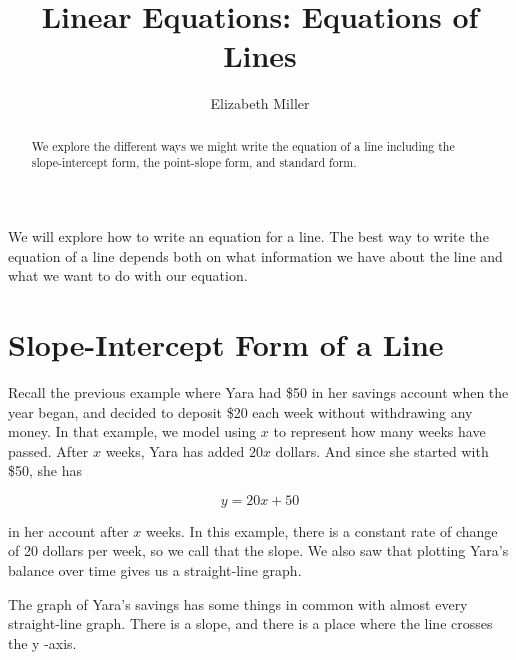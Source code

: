 \documentclass[nooutcomes]{ximera}
\author{Elizabeth Miller}
\title{Linear Equations: Equations of Lines}
\begin{document}
\begin{abstract}
  We explore the different ways we might write the equation of a line including the slope-intercept form, the point-slope form, and standard form.
\end{abstract}
\licenseORCCA
\maketitle


We will explore how to write an equation for a line.  The best way to write the equation of a line depends both on what information we have about the line and what we want to do with our equation.  



\section{Slope-Intercept Form of a Line}

Recall the previous example where Yara had \$50 in her savings account when the year began, and decided to deposit \$20 each week without withdrawing any money. In that example, we model using $x$ to represent how many weeks have passed. After $x$  weeks, Yara has added $20x$ dollars. And since she started with \$50,  she has

$$y=20x+50$$ 

in her account after $x$ weeks. In this example, there is a constant rate of change of 20 dollars per week, so we call that the slope. We also saw that plotting Yara's balance over time gives us a straight-line graph.

\begin{image}
\end{image}

The graph of Yara's savings has some things in common with almost every straight-line graph. There is a slope, and there is a place where the line crosses the 
y
-axis.
\end{document}
